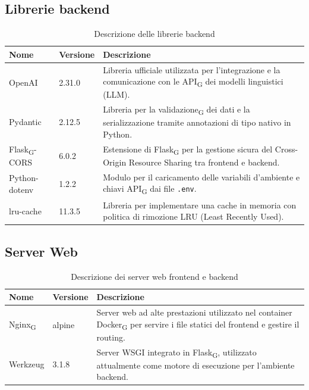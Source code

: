 \documentclass[11pt,a4paper]{article}
\newcommand{\gls}[1]{#1\textsubscript{G}}
\begin{document}
\subsection{Librerie backend}
\begin{table}[H]
    \centering
    \begin{tabular}{|p{}|p{}|p{}|}
        \hline
        \textbf{Nome} & \textbf{Versione} & \textbf{Descrizione} \\
        \hline
        OpenAI & 2.31.0 & Libreria ufficiale utilizzata per l'integrazione e la comunicazione con le \gls{API} dei modelli linguistici (LLM). \\
        \hline
        Pydantic & 2.12.5 & Libreria per la \gls{validazione} dei dati e la serializzazione tramite annotazioni di tipo nativo in Python. \\
        \hline
        \gls{Flask}-CORS & 6.0.2 & Estensione di \gls{Flask} per la gestione sicura del Cross-Origin Resource Sharing tra frontend e backend. \\
        \hline
        Python-dotenv & 1.2.2 & Modulo per il caricamento delle variabili d'ambiente e chiavi \gls{API} dai file \texttt{.env}. \\
        \hline
        lru-cache & 11.3.5 & Libreria per implementare una cache in memoria con politica di rimozione LRU (Least Recently Used). \\
        \hline
    \end{tabular}
    \caption{Descrizione delle librerie backend}
    \label{tab:librerie_backend}
\end{table}

\subsection{Server Web}
\begin{table}[H]
    \centering
    \begin{tabular}{|p{}|p{}|p{}|}
        \hline
        \textbf{Nome} & \textbf{Versione} & \textbf{Descrizione} \\
        \hline
        \gls{Nginx} & alpine & Server web ad alte prestazioni utilizzato nel container \gls{Docker} per servire i file statici del frontend e gestire il routing. \\
        \hline
        Werkzeug & 3.1.8 & Server WSGI integrato in \gls{Flask}, utilizzato attualmente come motore di esecuzione per l'ambiente backend. \\
        \hline
    \end{tabular}
    \caption{Descrizione dei server web frontend e backend}
    \label{tab:server_web}
\end{table}
\end{document}
